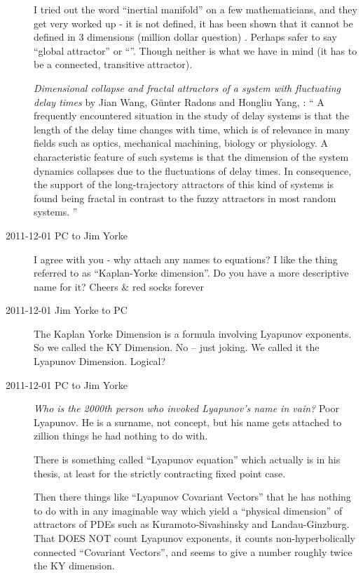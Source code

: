 \begin{description}
I tried out the word ``inertial manifold'' on a few mathematicians, and
they get very worked up - it is not defined, it has been shown that it
cannot be defined in 3 dimensions (million dollar question) \etc. Perhaps
safer to say ``global attractor'' or ``{\nws}''. Though neither is what
we have in mind (it has to be a connected, transitive attractor).

\emph{Dimensional collapse and fractal attractors of a system with fluctuating
 delay times}
by Jian Wang, G\"unter Radons and Hongliu Yang,
:
``
 A frequently encountered situation in the study of delay systems is that the
length of the delay time changes with time, which is of relevance in many
fields such as optics, mechanical machining, biology or physiology. A
characteristic feature of such systems is that the dimension of the system
dynamics collapses due to the fluctuations of delay times. In consequence, the
support of the long-trajectory attractors of this kind of systems is found
being fractal in contrast to the fuzzy attractors in most random systems.
''

\item[2011-12-01 PC to Jim Yorke] I agree with you - why attach any names
to equations? I like the thing referred to as ``Kaplan-Yorke dimension''.
Do you have a more descriptive name for it?
Cheers \& red socks forever

\item[2011-12-01 Jim Yorke to PC] The Kaplan Yorke Dimension is a formula
involving Lyapunov exponents. So we called the KY Dimension. No -- just
joking. We called it the Lyapunov Dimension. Logical?

\item[2011-12-01 PC to Jim Yorke] \emph{Who is the 2000th person who
invoked Lyapunov's name in vain?} Poor Lyapunov. He is a surname, not
concept, but his name gets attached to zillion things he had nothing to
do with.

There is something called ``Lyapunov equation'' which actually is in his
thesis, at least for the strictly contracting fixed point case.

Then there things like ``Lyapunov Covariant Vectors'' that he has nothing
to do with in any imaginable way which yield a ``physical dimension'' of
attractors of PDEs such as Kuramoto-Sivashinsky and Landau-Ginzburg. That
DOES NOT count Lyapunov exponents, it counts non-hyperbolically connected
``Covariant Vectors'', and seems to give a number roughly twice the KY
dimension.


\end{description}
